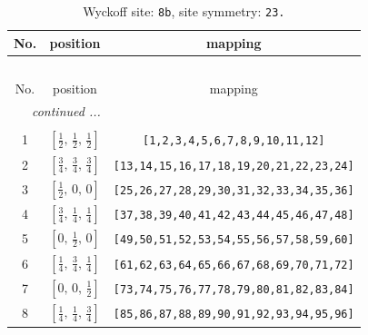 \documentclass[fleqn,8pt]{jsarticle}
\begin{document}
\begin{longtable}{ccc}
\caption{Wyckoff site: {\tt 8b}, site symmetry: {\tt 23.}}
 \\
 \hline \hline
No. & position & mapping \\ \hline \endfirsthead

\multicolumn{2}{l}{\tablename\ \thetable{}} \\
 \hline \hline
No. & position & mapping \\ \hline \endhead

 \hline \hline
\multicolumn{2}{r}{\footnotesize\it continued ...} \\ \endfoot

 \hline \hline
\multicolumn{2}{r}{} \\ \endlastfoot

1 & $\left[ \frac{1}{2},\, \frac{1}{2},\, \frac{1}{2} \right]$ & {\tt [1,2,3,4,5,6,7,8,9,10,11,12]} \\ \hline
2 & $\left[ \frac{3}{4},\, \frac{3}{4},\, \frac{3}{4} \right]$ & {\tt [13,14,15,16,17,18,19,20,21,22,23,24]} \\ \hline
3 & $\left[ \frac{1}{2},\, 0,\, 0 \right]$ & {\tt [25,26,27,28,29,30,31,32,33,34,35,36]} \\ \hline
4 & $\left[ \frac{3}{4},\, \frac{1}{4},\, \frac{1}{4} \right]$ & {\tt [37,38,39,40,41,42,43,44,45,46,47,48]} \\ \hline
5 & $\left[ 0,\, \frac{1}{2},\, 0 \right]$ & {\tt [49,50,51,52,53,54,55,56,57,58,59,60]} \\ \hline
6 & $\left[ \frac{1}{4},\, \frac{3}{4},\, \frac{1}{4} \right]$ & {\tt [61,62,63,64,65,66,67,68,69,70,71,72]} \\ \hline
7 & $\left[ 0,\, 0,\, \frac{1}{2} \right]$ & {\tt [73,74,75,76,77,78,79,80,81,82,83,84]} \\ \hline
8 & $\left[ \frac{1}{4},\, \frac{1}{4},\, \frac{3}{4} \right]$ & {\tt [85,86,87,88,89,90,91,92,93,94,95,96]} \\
\end{longtable}
\renewcommand{\arraystretch}{1.2}
\end{document}
